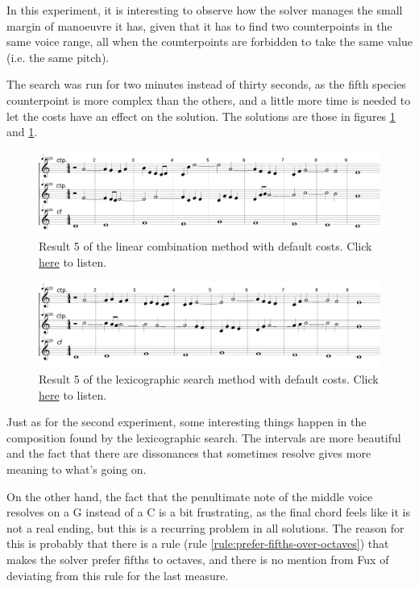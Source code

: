 In this experiment, it is interesting to observe how the solver manages the small margin of manoeuvre it has, given that it has to find two counterpoints in the same voice range, all when the counterpoints are forbidden to take the same value (i.e. the same pitch).

The search was run for two minutes instead of thirty seconds, as the fifth species counterpoint is more complex than the others, and a little more time is needed to let the costs have an effect on the solution. The solutions are those in figures \ref{fig:combili-5sp} and \ref{fig:combili-5sp}.

\begin{figure}[h]
    \centering
    \includegraphics[width=1\textwidth]{Images/Experiments/linear-combination-5sp.png}
    \caption{Result 5 of the linear combination method with default costs. Click \href{https://youtu.be/Lyi2Tv0eto8}{here} to listen.}
    \label{fig:combili-5sp}
\end{figure}

\begin{figure}[h]
    \centering
    \includegraphics[width=1\textwidth]{Images/Experiments/basic-lexico-5sp.png}
    \caption{Result 5 of the lexicographic search method with default costs. Click \href{https://youtu.be/wYq28XcmpVw}{here} to listen.}
    \label{fig:lexico-5sp}
\end{figure}

Just as for the second experiment, some interesting things happen in the composition found by the lexicographic search. The intervals are more beautiful and the fact that there are dissonances that sometimes resolve gives more meaning to what's going on.

On the other hand, the fact that the penultimate note of the middle voice resolves on a G instead of a C is a bit frustrating, as the final chord feels like it is not a real ending, but this is a recurring problem in all solutions. The reason for this is probably that there is a rule (rule \ref{rule:prefer-fifths-over-octaves}) that makes the solver prefer fifths to octaves, and there is no mention from Fux of deviating from this rule for the last measure.

